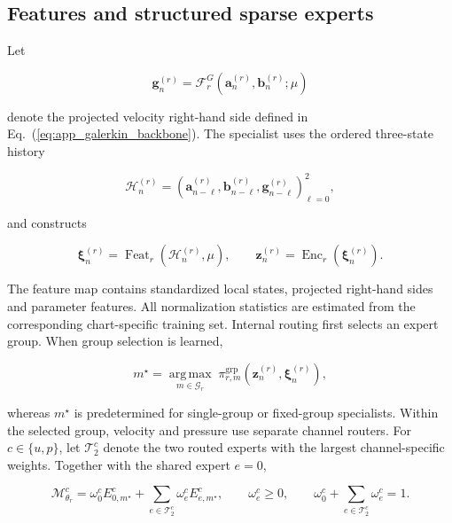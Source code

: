\documentclass{article}
\def\plaineqref#1{\ref{#1}}
\begin{document}
\subsection{Features and structured sparse experts}

Let


\begin{equation}
  \bm g_n^{(r)}
  =
  \mathcal F_r^G
  \left(
    \bm a_n^{(r)},\bm b_n^{(r)};\mu
  \right)
  \label{eq:app_galerkin_feature}
\end{equation}


denote the projected velocity right-hand side defined in Eq.~(\plaineqref{eq:app_galerkin_backbone}). The specialist uses the ordered three-state history


\begin{equation}
  \mathcal H_n^{(r)}
  =
  \left(
    \bm a_{n-\ell}^{(r)},
    \bm b_{n-\ell}^{(r)},
    \bm g_{n-\ell}^{(r)}
  \right)_{\ell=0}^{2},
  \label{eq:app_specialist_history}
\end{equation}


and constructs


\begin{equation}
  \bm\xi_n^{(r)}
  =
  \operatorname{Feat}_r
  \left(
    \mathcal H_n^{(r)},\mu
  \right),
  \qquad
  \bm z_n^{(r)}
  =
  \operatorname{Enc}_r
  \left(
    \bm\xi_n^{(r)}
  \right).
  \label{eq:app_specialist_features}
\end{equation}


The feature map contains standardized local states, projected
right-hand sides and parameter features. All normalization statistics are estimated from the corresponding chart-specific training set. Internal routing first selects an expert group. When group selection is learned,


\begin{equation}
  m^\star
  =
  \underset{m\in\mathcal G_r}{\operatorname{arg\,max}}
  \;
  \pi_{r,m}^{\mathrm{grp}}
  \left(
    \bm z_n^{(r)},\bm\xi_n^{(r)}
  \right),
  \label{eq:app_group_top1}
\end{equation}


whereas $m^\star$ is predetermined for single-group or fixed-group
specialists. Within the selected group, velocity and pressure use separate channel routers. For $c\in\{u,p\}$, let $\mathcal T_2^c$ denote the two routed experts with the largest channel-specific weights. Together with the shared expert $e=0$,


\begin{equation}
  \mathcal M_{\theta_r}^c
  =
  \omega_0^c
  E_{0,m^\star}^c
  +
  \sum_{e\in\mathcal T_2^c}
  \omega_e^c
  E_{e,m^\star}^c,
  \qquad
  \omega_e^c\ge0,
  \qquad
  \omega_0^c+\sum_{e\in\mathcal T_2^c}\omega_e^c=1.
  \label{eq:app_channel_sparse_moe}
\end{equation}
\end{document}
